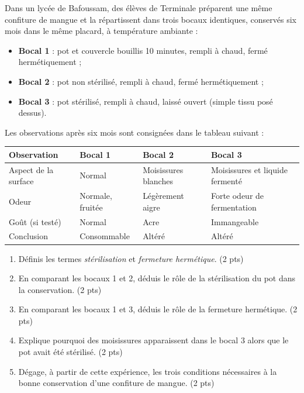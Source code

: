 \documentclass[11pt]{article}
\begin{document}
\begin{exercice}
Dans un lycée de Bafoussam, des élèves de Terminale préparent une même confiture de mangue et la répartissent dans trois bocaux identiques, conservés six mois dans le même placard, à température ambiante :
\begin{itemize}
\item \textbf{Bocal 1} : pot et couvercle bouillis 10 minutes, rempli à chaud, fermé hermétiquement ;
\item \textbf{Bocal 2} : pot non stérilisé, rempli à chaud, fermé hermétiquement ;
\item \textbf{Bocal 3} : pot stérilisé, rempli à chaud, laissé ouvert (simple tissu posé dessus).
\end{itemize}
Les observations après six mois sont consignées dans le tableau suivant :
\begin{center}
\begin{tabularx}{\linewidth}{|l|X|X|X|}
\hline
\rowcolor{popblueL} \textbf{Observation} & \textbf{Bocal 1} & \textbf{Bocal 2} & \textbf{Bocal 3} \\
\hline
Aspect de la surface & Normal & Moisissures blanches & Moisissures et liquide fermenté \\
\hline
Odeur & Normale, fruitée & Légèrement aigre & Forte odeur de fermentation \\
\hline
Goût (si testé) & Normal & Acre & Immangeable \\
\hline
Conclusion & Consommable & Altéré & Altéré \\
\hline
\end{tabularx}
\end{center}
\begin{enumerate}
\item Définis les termes \emph{stérilisation} et \emph{fermeture hermétique}. (2 pts)
\item En comparant les bocaux 1 et 2, déduis le rôle de la stérilisation du pot dans la conservation. (2 pts)
\item En comparant les bocaux 1 et 3, déduis le rôle de la fermeture hermétique. (2 pts)
\item Explique pourquoi des moisissures apparaissent dans le bocal 3 alors que le pot avait été stérilisé. (2 pts)
\item Dégage, à partir de cette expérience, les trois conditions nécessaires à la bonne conservation d'une confiture de mangue. (2 pts)
\end{enumerate}
\end{exercice}
\end{document}
